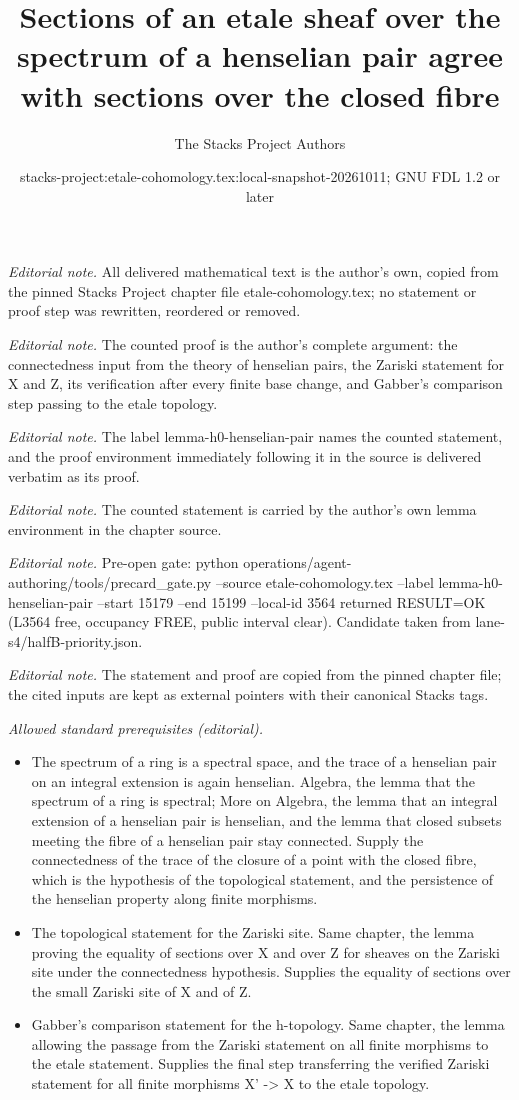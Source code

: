 \documentclass[10pt,a4paper]{amsart}
\title{Sections of an etale sheaf over the spectrum of a henselian pair agree with sections over the closed fibre}
\author{The Stacks Project Authors}
\date{stacks-project:etale-cohomology.tex:local-snapshot-20261011; GNU FDL 1.2 or later}
\theoremstyle{plain}
\theoremstyle{definition}
\theoremstyle{remark}
\numberwithin{equation}{subsection}
\begin{document}
\maketitle
\noindent\textit{Editorial note.} All delivered mathematical text is the author's own, copied from the pinned Stacks Project chapter file etale-cohomology.tex; no statement or proof step was rewritten, reordered or removed.\par\medskip
\noindent\textit{Editorial note.} The counted proof is the author's complete argument: the connectedness input from the theory of henselian pairs, the Zariski statement for X and Z, its verification after every finite base change, and Gabber's comparison step passing to the etale topology.\par\medskip
\noindent\textit{Editorial note.} The label lemma-h0-henselian-pair names the counted statement, and the proof environment immediately following it in the source is delivered verbatim as its proof.\par\medskip
\noindent\textit{Editorial note.} The counted statement is carried by the author's own lemma environment in the chapter source.\par\medskip
\noindent\textit{Editorial note.} Pre-open gate: python operations/agent-authoring/tools/precard\_gate.py --source etale-cohomology.tex --label lemma-h0-henselian-pair --start 15179 --end 15199 --local-id 3564 returned RESULT=OK (L3564 free, occupancy FREE, public interval clear). Candidate taken from lane-s4/halfB-priority.json.\par\medskip
\noindent\textit{Editorial note.} The statement and proof are copied from the pinned chapter file; the cited inputs are kept as external pointers with their canonical Stacks tags.\par\medskip
\noindent\textit{Allowed standard prerequisites (editorial).}\begin{itemize}
\item The spectrum of a ring is a spectral space, and the trace of a henselian pair on an integral extension is again henselian. Algebra, the lemma that the spectrum of a ring is spectral; More on Algebra, the lemma that an integral extension of a henselian pair is henselian, and the lemma that closed subsets meeting the fibre of a henselian pair stay connected. Supply the connectedness of the trace of the closure of a point with the closed fibre, which is the hypothesis of the topological statement, and the persistence of the henselian property along finite morphisms.
\item The topological statement for the Zariski site. Same chapter, the lemma proving the equality of sections over X and over Z for sheaves on the Zariski site under the connectedness hypothesis. Supplies the equality of sections over the small Zariski site of X and of Z.
\item Gabber's comparison statement for the h-topology. Same chapter, the lemma allowing the passage from the Zariski statement on all finite morphisms to the etale statement. Supplies the final step transferring the verified Zariski statement for all finite morphisms X' -> X to the etale topology.
\end{itemize}\medskip
\end{document}
